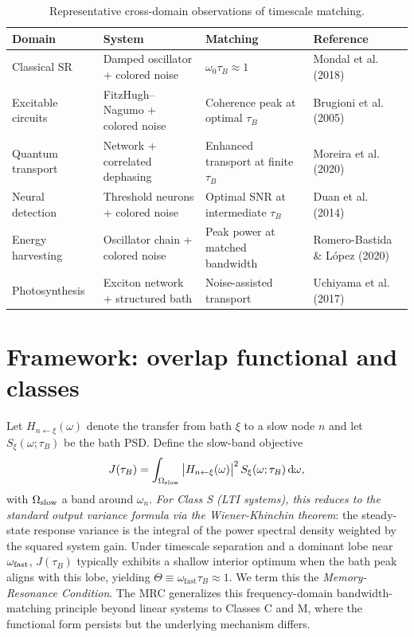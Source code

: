 \documentclass[11pt,letterpaper]{article}
\begin{document}
\begin{table}[h!]
\centering
\caption{Representative cross-domain observations of timescale matching.}
\label{tab:crossdomain}
\begin{tabularx}{\linewidth}{@{}lYYl@{}}
\toprule
Domain & System & Matching & Reference \\
\midrule
Classical SR & Damped oscillator + colored noise & $\omega_0 \tau_B \approx 1$ & Mondal et al. (2018) \cite{Mondal2018} \\
Excitable circuits & FitzHugh--Nagumo + colored noise & Coherence peak at optimal $\tau_B$ & Brugioni et al. (2005) \cite{Brugioni2005} \\
Quantum transport & Network + correlated dephasing & Enhanced transport at finite $\tau_B$ & Moreira et al. (2020) \cite{Moreira2020} \\
Neural detection & Threshold neurons + colored noise & Optimal SNR at intermediate $\tau_B$ & Duan et al. (2014) \cite{Duan2014} \\
Energy harvesting & Oscillator chain + colored noise & Peak power at matched bandwidth & Romero-Bastida \& L\'opez (2020) \cite{RomeroBastida2020} \\
Photosynthesis & Exciton network + structured bath & Noise-assisted transport & Uchiyama et al. (2017) \cite{Uchiyama2017} \\
\bottomrule
\end{tabularx}
\end{table}

\clearpage
\section{Framework: overlap functional and classes}
Let $H_{n\leftarrow\xi}(\omega)$ denote the transfer from bath $\xi$ to a slow node $n$ and let $S_\xi(\omega;\tau_B)$ be the bath PSD. Define the slow-band objective
\begin{equation}
J(\tau_B) = \int_{\Omega_{\rm slow}} \big|H_{n\leftarrow\xi}(\omega)\big|^2\, S_\xi(\omega;\tau_B)\, \mathrm{d}\omega,
\end{equation}
with $\Omega_{\rm slow}$ a band around $\omega_n$. \emph{For Class S (LTI systems), this reduces to the standard output variance formula via the Wiener-Khinchin theorem}: the steady-state response variance is the integral of the power spectral density weighted by the squared system gain. Under timescale separation and a dominant lobe near $\omega_{\rm fast}$, $J(\tau_B)$ typically exhibits a shallow interior optimum when the bath peak aligns with this lobe, yielding $\Theta \equiv \omega_{\mathrm{fast}} \tau_B \approx 1$. We term this the \emph{Memory-Resonance Condition}. The MRC generalizes this frequency-domain bandwidth-matching principle beyond linear systems to Classes C and M, where the functional form persists but the underlying mechanism differs.
\end{document}
